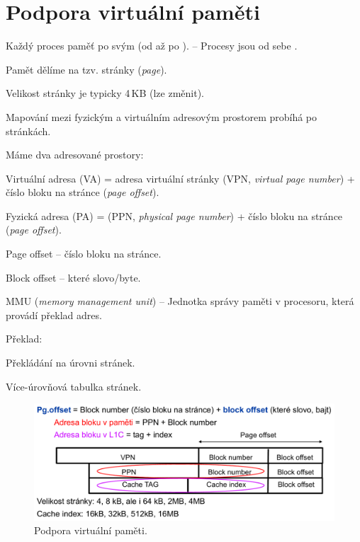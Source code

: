 
\section{Podpora virtuální paměti}

\begin{compactitem}
    \item Každý proces  paměť po svým (od  až po ). -- Procesy jsou od sebe .

    \item Pamět dělíme na tzv. stránky (\textit{page}). \begin{compactitem}
        \item Velikost stránky je typicky 4\,KB (lze změnit).
        \item Mapování mezi fyzickým a virtuálním adresovým prostorem probíhá po stránkách.
    \end{compactitem}

    \item Máme dva adresované prostory: \begin{compactitem}
        \item Virtuální adresa (VA) = adresa virtuální stránky (VPN, \textit{virtual page number}) + číslo bloku na stránce (\textit{page offset}).
        \item Fyzická adresa (PA) = (PPN, \textit{physical page number}) + číslo bloku na stránce (\textit{page offset}).
    \end{compactitem}

    \item Page offset -- číslo bloku na stránce.
    \item Block offset -- které slovo/byte.

    \item MMU (\textit{memory management unit}) -- Jednotka správy paměti v procesoru, která provádí překlad adres.

    \item Překlad: \begin{compactitem}
        \item Překládání na úrovni stránek.
        \item Více-úrovňová tabulka stránek.
    \end{compactitem}

    \begin{figure}[H]
        \centering
        \includegraphics[width=0.9\linewidth]{podpora_virtualni_pameti.pdf}
        \caption{Podpora virtuální paměti.}
    \end{figure}
\end{compactitem}

